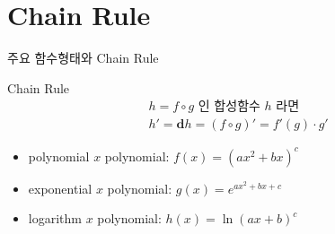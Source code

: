 \documentclass[aspectratio=169]{beamer}
\begin{document}
\section{Chain Rule}
\begin{frame}{주요 함수형태와 Chain Rule}
  \begin{block}{Chain Rule}
    \begin{align*}
      & h = {f} \circ {g} \text{ 인 합성함수 } h \text{ 라면} \\
      & h' = \mathbf{d} h  = ( {f} \circ {g} )' = {f'}({g}) \cdot {g'}
    \end{align*}
  \end{block}
  \begin{itemize}
    \item polynomial $ x $ polynomial: $ f(x) = (ax^2 + bx)^{c} $
    \item exponential $ x $ polynomial: $ g(x) = e^{ax^2 + bx + c} $
    \item logarithm $ x $ polynomial: $ h(x) = \ln (ax + b)^c $
  \end{itemize}
  
\end{frame}
\end{document}
